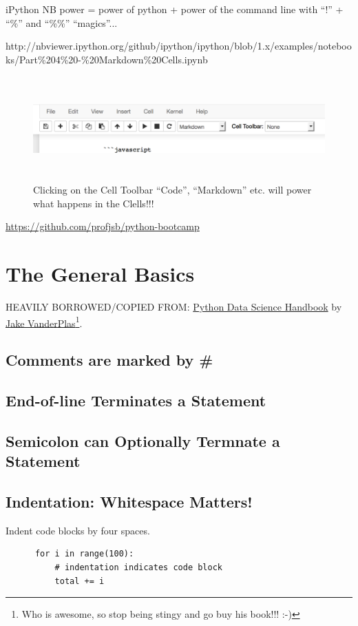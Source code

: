 \documentclass[11pt,a4paper]{article}
\begin{document}
    iPython NB power = power of python + power of the command line with ``!'' + ``\%'' and ``\%\%'' ``magics''... 
    
http://nbviewer.ipython.org/github/ipython/ipython/blob/1.x/examples/notebooks/Part\%204\%20-\%20Markdown\%20Cells.ipynb

\begin{figure}
  \includegraphics[height=4.0cm,width=14.0cm]
  {iPython_NB_toolbar.pdf}
  \centering
  \caption[]
  {Clicking on the Cell Toolbar ``Code'', ``Markdown'' etc. will power what happens in the Clells!!!}
  \label{fig:fig1}
\end{figure}
\href{https://github.com/profjsb/python-bootcamp}{https://github.com/profjsb/python-bootcamp}


\newpage
\section{The General Basics}
HEAVILY BORROWED/COPIED FROM: 
\href{http://shop.oreilly.com/product/0636920034919.do}{Python Data Science Handbook} by
\href{https://jakevdp.github.io/}{Jake VanderPlas}\footnote{Who is awesome, so stop being stingy and go buy his book!!! :-)}. 

\subsection*{Comments are marked by \#}

\subsection*{End-of-line Terminates a Statement}
\subsection*{Semicolon can Optionally Termnate a Statement}   

    \subsection*{Indentation: Whitespace Matters!}
    Indent code blocks by four spaces. 
    \begin{lstlisting}
      for i in range(100):
          # indentation indicates code block 
          total += i
    \end{lstlisting}
    
\end{document}
